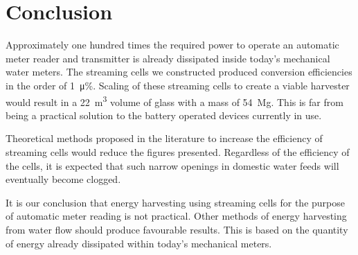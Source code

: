 \documentclass[10pt,final,journal]{IEEEtran}
\begin{document}
    \section{Conclusion}
    \label{sect:conclusion}
    Approximately one hundred times the required power to operate an automatic meter reader and transmitter is already dissipated inside today's mechanical water meters.
    The streaming cells we constructed produced conversion efficiencies in the order of \SI{1}{\micro\percent}.
    Scaling of these streaming cells to create a viable harvester would result in a \SI{22}{\cubic\metre} volume of glass with a mass of \SI{54}{\mega\gram}.
    This is far from being a practical solution to the battery operated devices currently in use.

    Theoretical methods proposed in the literature to increase the efficiency of streaming cells would reduce the figures presented.
    Regardless of the efficiency of the cells, it is expected that such narrow openings in domestic water feeds will eventually become clogged.

    It is our conclusion that energy harvesting using streaming cells for the purpose of automatic meter reading is not practical.
    Other methods of energy harvesting from water flow should produce favourable results.
    This is based on the quantity of energy already dissipated within today's mechanical meters.
    
    
\end{document}
